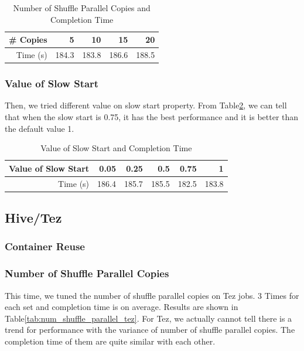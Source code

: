 \documentclass[10pt]{article}
\begin{document}
\begin{table}[htbp]
  \centering
  \caption{Number of Shuffle Parallel Copies and Completion Time}
    \begin{tabular}{rrrrr}
    \toprule
    \# Copies & 5     & 10    & 15    & 20 \\
    \midrule
    Time (s) & 184.3 & 183.8 & 186.6 & 188.5 \\
    \bottomrule
    \end{tabular}%
  \label{tab:num_of_parallel}%
\end{table}%



\subsubsection{Value of Slow Start}

Then, we tried different value on slow start property. From Table\ref{tab:val_of_slow}, we can tell that when the slow start is 0.75, it has the best performance and it is better than the default value 1.

\begin{table}[htbp]
  \centering
  \caption{Value of Slow Start and Completion Time}
    \begin{tabular}{rrrrrr}
    \toprule
    Value of Slow Start & 0.05  & 0.25  & 0.5   & 0.75  & 1 \\
    \midrule
    Time (s) & 186.4 & 185.7 & 185.5 & 182.5 & 183.8 \\
    \bottomrule
    \end{tabular}%
  \label{tab:val_of_slow}%
\end{table}%


 

\subsection{Hive/Tez}
\subsubsection{Container Reuse}

\subsubsection{Number of Shuffle Parallel Copies}

This time, we tuned the number of shuffle parallel copies on Tez jobs. 3 Times for each set and completion time is on average. Results are shown in Table\ref{tab:num_shuffle_parallel_tez}. For Tez, we actually cannot tell there is a trend for performance with the variance of number of shuffle parallel copies. The completion time of them are quite similar with each other. 
\end{document}
